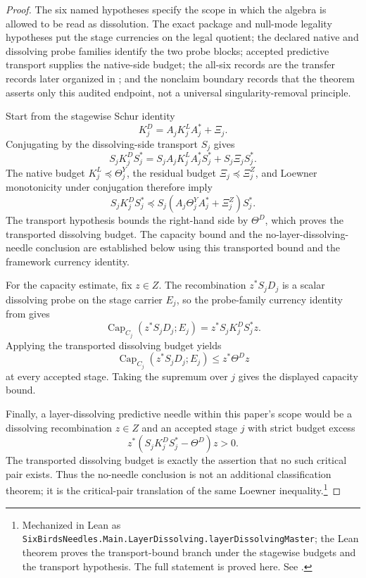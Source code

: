 \documentclass[11pt]{article}
\DeclareMathOperator{\Capacity}{Cap}
\newcommand{\preceqq}{\preceq}
\theoremstyle{definition}
\begin{document}
\begin{proof}
The six named hypotheses specify the scope in which the algebra is
allowed to be read as dissolution.  The exact package and null-mode
legality hypotheses put the stage currencies on the legal quotient; the
declared native and dissolving probe families identify the two probe
blocks; accepted predictive transport supplies the native-side budget;
the all-six records are the transfer records later organized in
; and the nonclaim boundary records that the theorem
asserts only this audited endpoint, not a universal singularity-removal
principle.

Start from the stagewise Schur identity
\[
  K^D_j=A_jK^L_jA_j^*+\Xi_j.
\]
Conjugating by the dissolving-side transport \(S_j\) gives
\[
  S_jK^D_jS_j^*
  =S_jA_jK^L_jA_j^*S_j^*+S_j\Xi_jS_j^*.
\]
The native budget \(K^L_j\preceqq\Theta^Y_j\), the residual budget
\(\Xi_j\preceqq\Xi^Z_j\), and Loewner monotonicity under conjugation
therefore imply
\[
  S_jK^D_jS_j^*
  \preceqq
  S_j(A_j\Theta^Y_jA_j^*+\Xi^Z_j)S_j^*.
\]
The transport hypothesis bounds the right-hand side by \(\Theta^D\),
which proves the transported dissolving budget.  The capacity bound and
the no-layer-dissolving-needle conclusion are established below using
this transported bound and the framework currency identity.

For the capacity estimate, fix \(z\in Z\).  The recombination
\(z^*S_jD_j\) is a scalar dissolving probe on the stage carrier
\(E_j\), so the probe-family currency identity from
 gives
\[
  \Capacity_{C_j}(z^*S_jD_j;E_j)=z^*S_jK^D_jS_j^*z.
\]
Applying the transported dissolving budget yields
\[
  \Capacity_{C_j}(z^*S_jD_j;E_j)\le z^*\Theta^Dz
\]
at every accepted stage.  Taking the supremum over \(j\) gives the
displayed capacity bound.

Finally, a layer-dissolving predictive needle within this paper's scope
would be a dissolving recombination \(z\in Z\) and an accepted stage
\(j\) with strict budget excess
\[
  z^*(S_jK^D_jS_j^*-\Theta^D)z>0.
\]
The transported dissolving budget is exactly the assertion that no such
critical pair exists.  Thus the no-needle conclusion is not an
additional classification theorem; it is the critical-pair translation
of the same Loewner inequality.\footnote{Mechanized in Lean as
\texttt{SixBirdsNeedles.Main.LayerDissolving.layerDissolvingMaster}; the
Lean theorem proves the transport-bound branch under the stagewise
budgets and the transport hypothesis.  The full statement is proved
here.  See .}
\end{proof}
\end{document}
